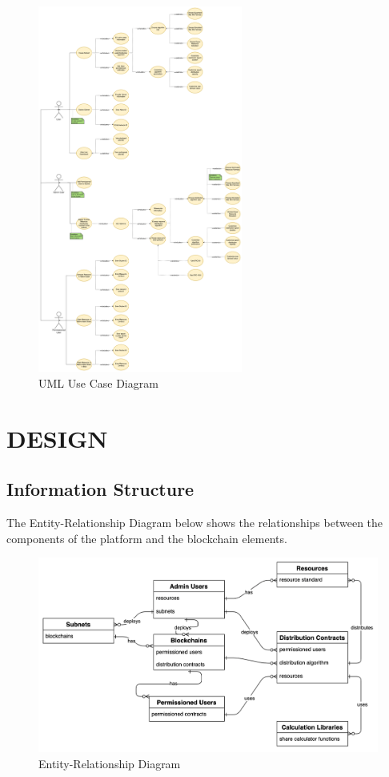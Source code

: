 \documentclass[a4paper,12pt]{report}
\begin{document}
\begin{figure}[H]
	\centering
	\includegraphics[width=0.6\textwidth]{use-case-big.png}
	\caption{UML Use Case Diagram}
\end{figure}

\chapter{DESIGN}

\section{Information Structure}
The Entity-Relationship Diagram below shows the relationships between the components of the platform and the blockchain elements.

\begin{figure}[H]
\centering
\includegraphics[width=1\textwidth]{erdiagram2.png}
\caption{Entity-Relationship Diagram}
\end{figure}
\end{document}
